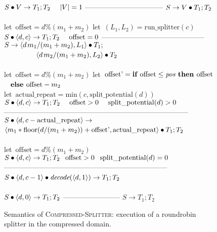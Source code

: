 \begin{figure}[t]
$S \bullet V \rightarrow T_1; T_2~~~~|V|=1$\skiptopb
---------------------------------\skipbot
$S \rightarrow V \bullet T_1; T_2$
~ \\ ~ \\
let~$\mbox{offset} = d$\%$(m_1+m_2)$\skiptopb
let~$(L_1, L_2) = \mbox{run\_splitter}(c)$\vspace{2pt}\\
$S \bullet \langle d, c\rangle \rightarrow T_1; T_2~~~~\mbox{offset} = 0$\vspace{-3pt}\skiptopa
--------------------------------------------\skipbot
$S \rightarrow \langle d{\hspace{1.3pt}}m_1/(m_1+m_2), L_1\rangle \bullet T_1;$\\
\mbox{~~~~~~~~~}\hspace{0.29pt}$\langle d{\hspace{1.3pt}}m_2/(m_1+m_2), L_2\rangle \bullet T_2$
~ \\ ~ \\
let~$\mbox{offset} = d$\%$(m_1+m_2)$\skiptopb
let~$\mbox{offset'} = \mbox{\bf if~} \mbox{offset} \leq \mbox{\it pos} \mbox{\bf ~then~} \mbox{offset}$\\
\mbox{~}\hspace{42.3pt}$\mbox{\bf ~else~} \mbox{offset} - m_2$\\
let~$\mbox{actual\_repeat} = \mbox{min}(c, \mbox{split\_potential}(d))$\\
$S \bullet \langle d, c\rangle \rightarrow T_1; T_2~~~~\mbox{offset} > 0~~~~\mbox{split\_potential}(d) > 0$\skiptopb
------------------------------------------------------------------------------\skipbot
$S \bullet \langle d, c - \mbox{actual\_repeat}\rangle \rightarrow$\\
$\langle m_1*\mbox{floor}(d / (m_1 + m_2)) + \mbox{offset'}, \mbox{actual\_repeat}\rangle \bullet T_1; T_2$
~ \\ ~ \\
let~$\mbox{offset} = d$\%$(m_1+m_2)$\skiptopb
$S \bullet \langle d, c\rangle \rightarrow T_1; T_2~~\hspace{1pt}\mbox{offset} > 0~~\hspace{1pt}\mbox{split\_potential}(d) = 0$\skiptopb
---------------------------------------------------------------------\skipbot
$S \bullet \langle d, c-1\rangle \bullet \mbox{\it decode}(\langle d, 1\rangle) \rightarrow T_1; T_2$
~ \\ ~ \\
$S \bullet \langle d, 0\rangle \rightarrow T_1; T_2$\skiptopb
------------------------\skipbot
$S \rightarrow T_1; T_2$
\caption{Semantics of \textsc{Compressed-Splitter}:  execution of a roundrobin
splitter in the compressed domain.
\protect\label{fig:compressed-splitter}}
\end{figure}

